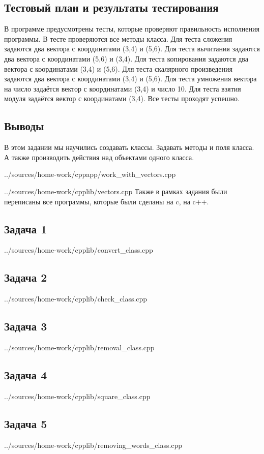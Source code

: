 \documentclass[12pt,a4paper]{report}
\begin{document}
\subsection{Тестовый план и результаты тестирования}
В программе предусмотрены тесты, которые проверяют правильность исполнения программы. В тесте проверяются все методы класса. Для теста сложения задаются два вектора с координатами (3,4) и (5,6). Для теста вычитания задаются два вектора с координатами (5,6) и (3,4). Для теста копирования задаются два вектора с координатами (3,4) и (5,6). Для теста скалярного произведения задаются два вектора с координатами (3,4) и (5,6). Для теста умножения вектора на число задаётся вектор с координатами (3,4) и число 10. Для теста взятия модуля задаётся вектор с координатами (3,4). Все тесты проходят успешно.
\subsection{Выводы}
В этом задании мы научились создавать классы. Задавать методы и поля класса. А также производить действия над объектами одного класса.

{../sources/home-work/cppapp/work_with_vectors.cpp}


{../sources/home-work/cpplib/vectors.cpp}
Также в рамках задания были переписаны все программы, которые были сделаны на c, на c++.
\subsection{Задача 1}

{../sources/home-work/cpplib/convert_class.cpp}
\subsection{Задача 2}

{../sources/home-work/cpplib/check_class.cpp}
\subsection{Задача 3}

{../sources/home-work/cpplib/removal_class.cpp}
\subsection{Задача 4}

{../sources/home-work/cpplib/square_class.cpp}
\subsection{Задача 5}

{../sources/home-work/cpplib/removing_words_class.cpp}
\end{document}
